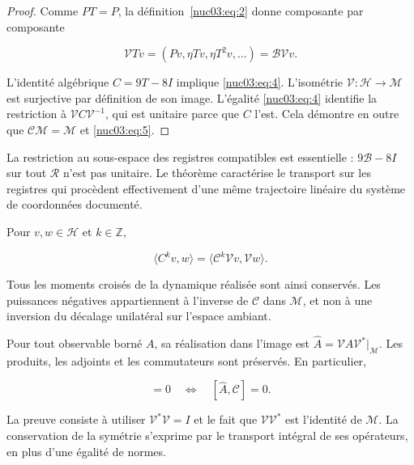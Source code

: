 \begin{proof}
Comme \(PT=P\), la définition~\eqref{nuc03:eq:2} donne composante par composante

\[
\mathcal VT v=(Pv,\eta Tv,\eta T^2v,\ldots)=\mathcal B\mathcal Vv.
\]

L’identité algébrique \(C=9T-8I\) implique \eqref{nuc03:eq:4}. L’isométrie \(\mathcal V:\mathcal H\to\mathcal M\) est surjective par définition de son image. L’égalité \eqref{nuc03:eq:4} identifie la restriction à \(\mathcal V C\mathcal V^{-1}\), qui est unitaire parce que \(C\) l’est. Cela démontre en outre que \(\mathcal C\mathcal M=\mathcal M\) et \eqref{nuc03:eq:5}.

\end{proof}

La restriction au sous-espace des registres compatibles est essentielle : \(9\mathcal B-8I\) sur tout \(\mathcal R\) n’est pas unitaire. Le théorème caractérise le transport sur les registres qui procèdent effectivement d’une même trajectoire linéaire du système de coordonnées documenté.

\begin{corollary}
Pour \(v,w\in\mathcal H\) et \(k\in\mathbb Z\),

\begin{equation}
\langle C^kv,w\rangle
=\langle\mathcal C^k\mathcal Vv,\mathcal Vw\rangle.
\label{nuc03:eq:6}
\end{equation}

Tous les moments croisés de la dynamique réalisée sont ainsi conservés. Les puissances négatives appartiennent à l’inverse de \(\mathcal C\) dans \(\mathcal M\), et non à une inversion du décalage unilatéral sur l’espace ambiant.
\end{corollary}

\begin{corollary}
Pour tout observable borné \(A\), sa réalisation dans l’image est \(\widehat A=\mathcal V A\mathcal V^*|_{\mathcal M}\). Les produits, les adjoints et les commutateurs sont préservés. En particulier,

\begin{equation}
[A,C]=0\quad\Longleftrightarrow\quad[\widehat A,\mathcal C]=0.
\label{nuc03:eq:7}
\end{equation}
\end{corollary}

La preuve consiste à utiliser \(\mathcal V^*\mathcal V=I\) et le fait que \(\mathcal V\mathcal V^*\) est l’identité de \(\mathcal M\). La conservation de la symétrie s’exprime par le transport intégral de ses opérateurs, en plus d’une égalité de normes.


